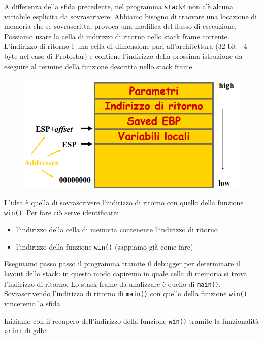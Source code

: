 A differenza della sfida precedente, nel programma \texttt{stack4} non c'è alcuna variabile esplicita da sovrascrivere. Abbiamo bisogno di traovare una locazione di memoria che se sovrascritta, provoca una modifica del flusso di esecuzione. Possiamo usare la cella di indirizzo di ritorno nello stack frame corrente. L'indirizzo di ritorno è una cella di dimensione pari all'architettura (32 bit - 4 byte nel caso di Protostar) e contiene l'indirizzo della prossima istruzione da eseguire al termine della funzione descritta nello stack frame.

\begin{figure}[hbpt!]
    \centering
    \includegraphics[width= 0.3 \textwidth]{./Images/cap7/7.7.png}
\end{figure}
\FloatBarrier

L'idea è quella di sovrascrivere l'indirizzo di ritorno con quello della funzione \texttt{win()}. Per fare ciò serve identificare:
\begin{itemize}
    \item l'indirizzo della cella di memoria contenente l'indirizzo di ritorno
    \item l'indirizzo della funzione \texttt{win()} (sappiamo già come fare)
\end{itemize}
Eseguiamo passo passo il programma tramite il debugger per determinare il layout dello stack: in questo modo capiremo in quale cella di memoria si trova l'indirizzo di ritorno. Lo stack frame da analizzare è quello di \texttt{main()}. Sovrascrivendo l'indirizzo di ritorno di \texttt{main()} con quello della funzione \texttt{win()} vinceremo la sfida. 

Iniziamo con il recupero dell'indirizzo della funzione \texttt{win()} tramite la funzionalità \texttt{print} di gdb:

